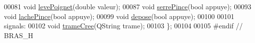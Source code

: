 \begin{DoxyCode}
00081         \textcolor{keywordtype}{void} \hyperlink{class_bras_ac95f54d8b02e7c88081f482fbbc40aef}{levePoignet}(\textcolor{keywordtype}{double} valeur);
00087         \textcolor{keywordtype}{void} \hyperlink{class_bras_a55e143cf8e696ed214809ae25fb558d5}{serrePince}(\textcolor{keywordtype}{bool} appuye);
00093         \textcolor{keywordtype}{void} \hyperlink{class_bras_a246e835f25bd61f0618c58aafea99ea1}{lachePince}(\textcolor{keywordtype}{bool} appuye);
00099         \textcolor{keywordtype}{void} \hyperlink{class_bras_a69d95616a74732e13b23bd90680d7d21}{depose}(\textcolor{keywordtype}{bool} appuye);
00100 
00101     signals:
00102         \textcolor{keywordtype}{void} \hyperlink{class_bras_ab442bf8d3e389c051b26b4b0741e7924}{trameCree}(QString trame); 
00103 \};
00104 
00105 \textcolor{preprocessor}{#endif // BRAS\_H}
\end{DoxyCode}
